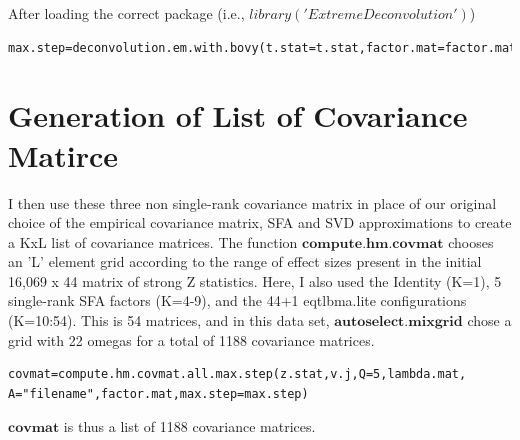 \documentclass[10pt]{article}
\begin{document}
\begin{itemize}
After loading the correct package (i.e., $library('ExtremeDeconvolution')$)
\begin{verbatim}
max.step=deconvolution.em.with.bovy(t.stat=t.stat,factor.mat=factor.mat,lambda.mat=lambda.mat,K=3,P=3)
\end{verbatim}
%  
%  
%  
%


\section{Generation of List of Covariance Matirce}
I then use these three non single-rank covariance matrix in place of our original choice of the empirical covariance matrix, SFA and SVD approximations to create a KxL list of covariance matrices. The function $\textbf{compute.hm.covmat}$ chooses an 'L' element grid according to the range of effect sizes present in the initial 16,069 x 44 matrix of strong Z statistics. 
Here, I also used the Identity (K=1), 5 single-rank SFA factors (K=4-9), and the 44+1 eqtlbma.lite configurations (K=10:54). This is 54 matrices, and in this data set, $\textbf{autoselect.mixgrid}$ chose a grid with 22 omegas for a total of 1188 covariance matrices.

\begin{verbatim}
covmat=compute.hm.covmat.all.max.step(z.stat,v.j,Q=5,lambda.mat,
A="filename",factor.mat,max.step=max.step)

\end{verbatim}

$\textbf{covmat}$ is thus a list of 1188 covariance matrices.



\end{itemize}
\end{document}
